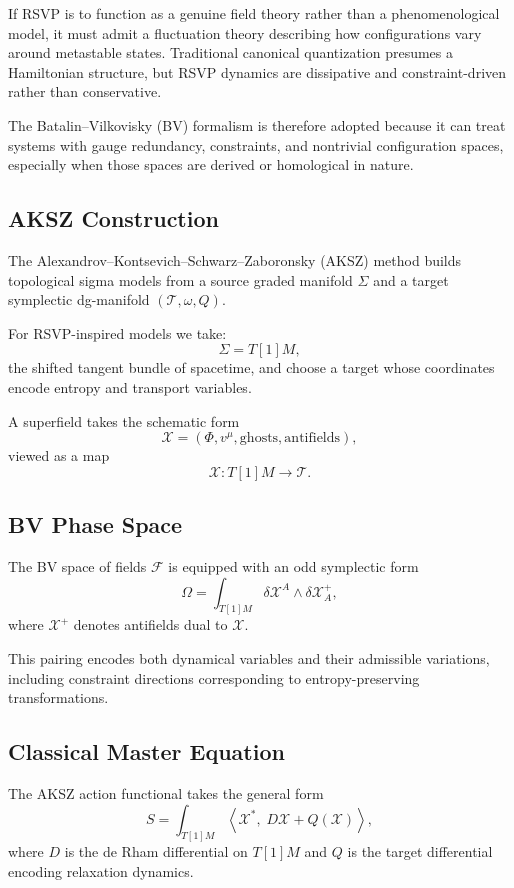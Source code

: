 \documentclass[12pt]{article}
\begin{document}
If RSVP is to function as a genuine field theory rather than a phenomenological model, it must admit a fluctuation theory describing how configurations vary around metastable states. Traditional canonical quantization presumes a Hamiltonian structure, but RSVP dynamics are dissipative and constraint-driven rather than conservative.

The Batalin--Vilkovisky (BV) formalism is therefore adopted because it can treat systems with gauge redundancy, constraints, and nontrivial configuration spaces, especially when those spaces are derived or homological in nature.

\subsection{AKSZ Construction}

The Alexandrov--Kontsevich--Schwarz--Zaboronsky (AKSZ) method builds topological sigma models from a source graded manifold $\Sigma$ and a target symplectic dg-manifold $(\mathcal{T},\omega,Q)$.

For RSVP-inspired models we take:
\[
\Sigma = T[1]M,
\]
the shifted tangent bundle of spacetime, and choose a target whose coordinates encode entropy and transport variables.

A superfield takes the schematic form
\[
\mathcal{X} = (\Phi, v^\mu, \text{ghosts}, \text{antifields}),
\]
viewed as a map
\[
\mathcal{X}: T[1]M \to \mathcal{T}.
\]

\subsection{BV Phase Space}

The BV space of fields $\mathcal{F}$ is equipped with an odd symplectic form
\[
\Omega = \int_{T[1]M} \delta \mathcal{X}^A \wedge \delta \mathcal{X}^+_A,
\]
where $\mathcal{X}^+$ denotes antifields dual to $\mathcal{X}$.

This pairing encodes both dynamical variables and their admissible variations, including constraint directions corresponding to entropy-preserving transformations.

\subsection{Classical Master Equation}

The AKSZ action functional takes the general form
\[
S = \int_{T[1]M} \left\langle \mathcal{X}^*,\; D\mathcal{X} + Q(\mathcal{X}) \right\rangle,
\]
where $D$ is the de Rham differential on $T[1]M$ and $Q$ is the target differential encoding relaxation dynamics.
\end{document}
